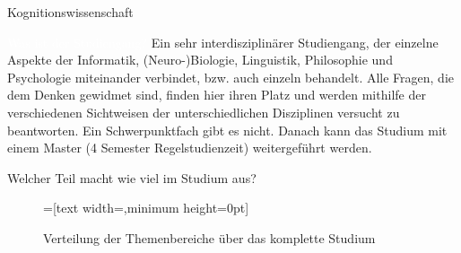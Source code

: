 


\begin{Huge}
    Kognitionswissenschaft
\end{Huge}

\begin{exampleblock}{\textcolor{white}{Was ist der Studiengang?}}
    Ein sehr interdisziplinärer Studiengang, der einzelne Aspekte der Informatik, (Neuro-)Biologie, Linguistik, Philosophie und Psychologie miteinander verbindet, bzw. auch einzeln behandelt. Alle Fragen, die dem Denken gewidmet sind, finden hier ihren Platz und werden mithilfe der verschiedenen Sichtweisen der unterschiedlichen Disziplinen versucht zu beantworten. Ein Schwerpunktfach gibt es nicht. Danach kann das Studium mit einem Master (4 Semester Regelstudienzeit) weitergeführt werden.
\end{exampleblock}

\begin{block}{Welcher Teil macht wie viel im Studium aus?}
    \begin{figure}[h!]
        \vspace{-10pt}
        \begin{minipage}{\linewidth}
            \centering
            =[text width={},minimum height=0pt]
        \end{minipage}
        \vspace{-20pt}
        \caption{Verteilung der Themenbereiche über das komplette Studium}
    \end{figure}
\end{block}

